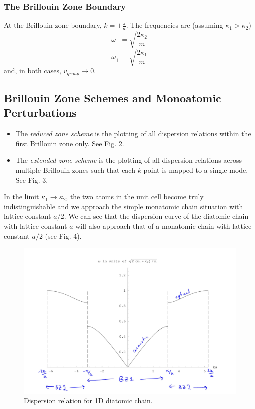 \documentclass[10pt]{article}
\begin{document}
\subsubsection{The Brillouin Zone Boundary}
At the Brillouin zone boundary, $k = \pm \frac{\pi}{a}$. The frequencies are (assuming $\kappa_{1} > \kappa_{2}$)
$$
\omega_{-} = \sqrt{\frac{2\kappa_{2}}{m}}
$$
$$
\omega_{+} =  \sqrt{\frac{2\kappa_{1}}{m}}
$$
and, in both cases, $v_{group} \rightarrow 0$.

\subsection{Brillouin Zone Schemes and Monoatomic Perturbations }
\begin{itemize}
  \item The \emph{reduced zone scheme} is the plotting of all dispersion relations within the first Brillouin zone only. See Fig. 2.
  \item The \emph{extended zone scheme} is the plotting of all dispersion relations across multiple Brillouin zones such that each $k$
  point is mapped to a single mode. See Fig. 3.
\end{itemize}

In the limit $\kappa_{1} \rightarrow \kappa_{2}$, the two atoms in the unit cell become truly indistinguishable and we approach the simple monatomic
chain situation with lattice constant $a/2$. We can see that the dispersion curve of the diatomic chain with lattice constant $a$ will also approach that of a monatomic chain
with lattice constant $a/2$ (see Fig. 4).
\begin{figure}
  \includegraphics[width=\linewidth]{1d_dia_ext.png}
  \caption{Dispersion relation for 1D diatomic chain.}
\end{figure}
\end{document}
